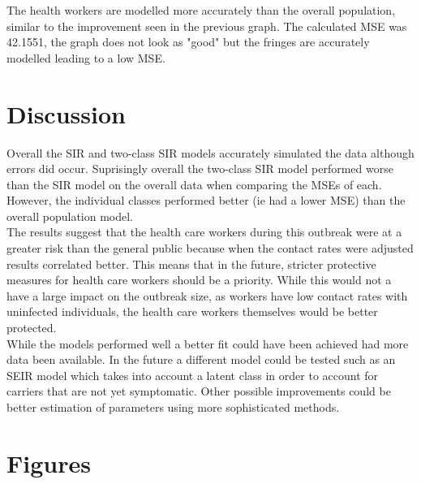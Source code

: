 \documentclass[twoside]{article}
\begin{document}
\begin{multicols}{2}
	The health workers are modelled more accurately than the overall population, similar to the
	improvement seen in the previous graph. The calculated MSE was 42.1551, the graph does not look
	as "good" but the fringes are accurately modelled leading to a low MSE.



\section{Discussion}

	Overall the SIR and two-class SIR models accurately simulated the data although errors did occur.
	Suprisingly overall the two-class SIR model performed worse than the SIR model on the overall data
	when comparing the MSEs of each. However, the individual classes performed better (ie had a lower MSE) 
	than the overall population model.\\

	The results suggest that the health care workers during this outbreak were at a greater risk than
	the general public because when the contact rates were adjusted results correlated better. This means
	that in the future, stricter protective measures for health care workers should be a priority. While this
	would not a have a large impact on the outbreak size, as workers have low contact rates with uninfected
	individuals, the health care workers themselves would be better protected.\\

	While the models performed well a better fit could have been achieved had more data been available.
	In the future a different model could be tested such as an SEIR model which takes into account a
	latent class in order to account for carriers that are not yet symptomatic. Other possible improvements
	could be better estimation of parameters using more sophisticated methods.


\end{multicols}

\newpage

\section{Figures}




\newpage

\end{document}
